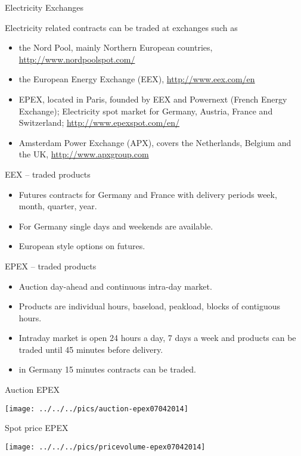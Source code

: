 {Electricity Exchanges}

Electricity related contracts  can be traded at exchanges such as
\begin{itemize}
\item<1-> the Nord Pool, mainly Northern European countries, \url{http://www.nordpoolspot.com/}
\item<2-> the European Energy Exchange (EEX), \url{http://www.eex.com/en}
\item<3-> EPEX, located in Paris, founded by EEX and Powernext (French Energy Exchange);
Electricity spot market for Germany, Austria, France and Switzerland;
\url{http://www.epexspot.com/en/}
\item<4-> Amsterdam Power Exchange (APX), covers the Netherlands, Belgium and the UK, \url{http://www.apxgroup.com}
\end{itemize}

{EEX -- traded products}
\begin{itemize}
\item<1-> Futures contracts for Germany and France with delivery periods week, month, quarter, year.
\item<2-> For Germany single days and weekends are available.
\item<3-> European style options on futures.
\end{itemize}

{EPEX -- traded products}
\begin{itemize}
\item<1-> Auction day-ahead and continuous intra-day market.
\item<2-> Products are individual hours, baseload, peakload, blocks of contiguous hours.
\item<3-> Intraday market is open 24 hours a day, 7 days a week and products can be traded until 45 minutes before delivery.
\item<4-> in Germany 15 minutes contracts can be traded.
\end{itemize}

{Auction EPEX}
\begin{center}
\texttt{[image: ../../../pics/auction-epex07042014]}
\end{center}

{Spot price EPEX}
\begin{center}
\texttt{[image: ../../../pics/pricevolume-epex07042014]}
\end{center}

